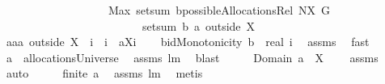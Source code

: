 \begin{isabellebody}
\ \ \ \ \ \ \ \ \ \ \ \ \ \ \ \ \ \ \ {\isachardoublequoteopen}Max\ {\isacharparenleft}{\isacharparenleft}setsum\ b{\isacharparenright}{\isacharbackquote}{\isacharparenleft}possibleAllocationsRel\ {\isacharparenleft}N{\isacharminus}X{\isacharparenright}\ G{\isacharparenright}{\isacharparenright}\ {\isasymge}\ \isanewline
\ \ \ \ \ \ \ \ \ \ \ \ \ \ \ \ \ \ \ \ \ \ \ \ \ setsum\ b\ {\isacharparenleft}a\ outside\ X{\isacharparenright}{\isachardoublequoteclose}\isanewline
%
\isadelimproof
%
\endisadelimproof
%
\isatagproof
{}\isamarkupfalse%
\ {\isacharminus}\isanewline
\ \ \isamarkupfalse%
\ {\isacharquery}aa{\isacharequal}{\isachardoublequoteopen}a\ outside\ {\isacharparenleft}X\ {\isasymunion}\ {\isacharbraceleft}i{\isacharbraceright}{\isacharparenright}\ {\isasymunion}\ {\isacharparenleft}{\isacharbraceleft}i{\isacharbraceright}\ {\isasymtimes}\ {\isacharbraceleft}{\isasymUnion}{\isacharparenleft}a{\isacharbackquote}{\isacharbackquote}{\isacharparenleft}X{\isasymunion}{\isacharbraceleft}i{\isacharbraceright}{\isacharparenright}{\isacharparenright}{\isacharbraceright}{\isacharparenright}{\isachardoublequoteclose}\isanewline
\ \ \isamarkupfalse%
\ {\isachardoublequoteopen}bidMonotonicity\ {\isacharparenleft}b{\isacharcolon}{\isacharcolon}{\isacharunderscore}\ {\isacharequal}{\isachargreater}\ real{\isacharparenright}\ i{\isachardoublequoteclose}\ \isamarkupfalse%
\ assms{\isacharparenleft}{}{\isacharparenright}\ \isamarkupfalse%
\ fast\isanewline
\ \ \isamarkupfalse%
\ \isamarkupfalse%
\ {\isachardoublequoteopen}a\ {\isasymin}\ allocationsUniverse{\isachardoublequoteclose}\ \isamarkupfalse%
\ assms{\isacharparenleft}{}{\isacharparenright}\ lm{}{}\ \isamarkupfalse%
\ blast\isanewline
\ \ \isamarkupfalse%
\ \isamarkupfalse%
\ {\isachardoublequoteopen}Domain\ a\ {\isasyminter}\ X\ {\isasymnoteq}\ {\isacharbraceleft}{\isacharbraceright}{\isachardoublequoteclose}\ \isamarkupfalse%
\ assms{\isacharparenleft}{}{\isacharparenright}\ \isamarkupfalse%
\ auto\isanewline
\ \ \isamarkupfalse%
\ \isamarkupfalse%
\ {\isachardoublequoteopen}finite\ a{\isachardoublequoteclose}\ \isamarkupfalse%
\ assms\ lm{}{}\ \isamarkupfalse%
\ metis\ \isamarkupfalse%
\ \isamarkupfalse%

\end{isabellebody}

